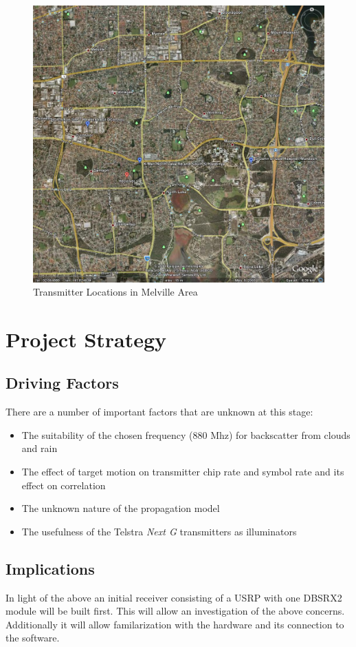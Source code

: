\documentclass[a4paper]{report}
\numberwithin{equation}{chapter}
\begin{document}
\begin{figure}
\centering 
\includegraphics[scale=0.35]{Melville-Transmitter-Locations.jpg}
\caption[Transmitter Locations in Melville Area]{Transmitter Locations in Melville Area}
\label{fig:xmitter-Melville}
\end{figure}

\clearpage\setcounter{page}{1}
\chapter[Project Strategy]{Project Strategy}
\section[Driving Factors]{Driving Factors}
There are a number of important factors that are unknown at this stage:
\begin{itemize}
\item{The suitability of the chosen frequency (880 Mhz) for backscatter from clouds and rain}
\item{The effect of target motion on transmitter chip rate and symbol rate and its effect on correlation}
\item{The unknown nature of the propagation model}
\item{The usefulness of the Telstra \textit{Next G} transmitters as illuminators}
\end{itemize}

\section[Implications]{Implications}
In light of the above an initial receiver consisting of a USRP with one DBSRX2 module will be built first. This will allow an investigation of the above concerns. Additionally it will allow familarization with the hardware and its connection to the software.
\end{document}
